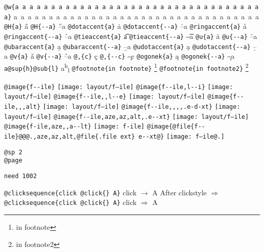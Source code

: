 \documentclass{book}
\renewcommand{\includegraphics}[1]{\fbox{FIG #1}}
\begin{document}
\texttt{@w\{a a a a a a a a a a a a a a a a a a a a a a a a a a a a a a a a a a a\}} \hbox{a a a a a a a a a a a a a a a a a a a a a a a a a a a a a a a a a a a}
\texttt{@H\{a\}} \H{a}
\texttt{@H\{{-}{-}a\}} \H{--a}
\texttt{@dotaccent\{a\}} \.{a}
\texttt{@dotaccent\{{-}{-}a\}} \.{--a}
\texttt{@ringaccent\{a\}} \r{a}
\texttt{@ringaccent\{{-}{-}a\}} \r{--a}
\texttt{@tieaccent\{a\}} \t{a}
\texttt{@tieaccent\{{-}{-}a\}} \t{--a}
\texttt{@u\{a\}} \u{a}
\texttt{@u\{{-}{-}a\}} \u{--a}
\texttt{@ubaraccent\{a\}} \b{a}
\texttt{@ubaraccent\{{-}{-}a\}} \b{--a}
\texttt{@udotaccent\{a\}} \d{a}
\texttt{@udotaccent\{{-}{-}a\}} \d{--a}
\texttt{@v\{a\}} \v{a}
\texttt{@v\{{-}{-}a\}} \v{--a}
\texttt{@,\{c\}} \c{c}
\texttt{@,\{{-}{-}c\}} \c{--c}
\texttt{@ogonek\{a\}} \k{a}
\texttt{@ogonek\{{-}{-}a\}} \k{--a}
\texttt{a@sup\{h\}@sub\{l\}} a\textsuperscript{h}\textsubscript{l}
\texttt{@footnote\{in footnote\}} \footnote{in footnote}
\texttt{@footnote\{in footnote2\}} \footnote{in footnote2}

\texttt{@image\{f{-}{-}ile\}} \texttt{[image: layout/f--ile]}
\texttt{@image\{f{-}{-}ile,l{-}{-}i\}} \texttt{[image: layout/f--ile]}
\texttt{@image\{f{-}{-}ile,,l{-}{-}e\}} \texttt{[image: layout/f--ile]}
\texttt{@image\{f{-}{-}ile,,,alt\}} \texttt{[image: layout/f--ile]}
\texttt{@image\{f{-}{-}ile,,,,.e-d-xt\}} \texttt{[image: layout/f--ile]}
\texttt{@image\{f{-}{-}ile,aze,az,alt,.e{-}{-}xt\}} \texttt{[image: layout/f--ile]}
\texttt{@image\{f-ile,aze,,a{-}{-}lt\}} \texttt{[image: f-ile]}
\texttt{@image\{@file\{f{-}{-}ile\}@@@.,aze,az,alt,@file\{.file ext\} e{-}{-}xt@\}} \texttt{[image: f--ile@.]}

\texttt{@sp 2}\leavevmode{}\\
\baselineskip %
\texttt{@page}\leavevmode{}\\
\newpage{}%

\texttt{need 1002}
\needspace{1.002pt}%

\texttt{@clicksequence\{click @click\{\} A\}} click $\rightarrow{}$ A
After clickstyle $\Rightarrow{}$
\texttt{@clicksequence\{click @click\{\} A\}} click $\Rightarrow{}$ A
\end{document}
